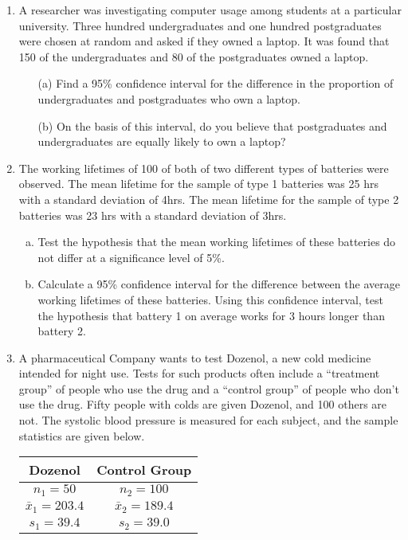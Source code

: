 \documentclass[]{article}
\begin{document}
\begin{enumerate}

\item 
 A researcher was investigating computer usage among students at a particular university. Three hundred undergraduates and one hundred postgraduates were chosen at random and asked if they owned a laptop. It was found that 150 of the undergraduates and 80 of the postgraduates owned a laptop. 
\begin{itemize}
    \item[(a)]  Find a 95\% confidence interval for the difference in the proportion of undergraduates and postgraduates who own a laptop. 
    \item[(b)] On the basis of this interval, do you believe that postgraduates and undergraduates are equally likely to own a laptop? 
\end{itemize}

    \item

The working lifetimes of 100 of both of two different types of batteries were observed. The mean lifetime for the sample of type 1 batteries was 25 hrs with a standard deviation of 4hrs. The mean lifetime for the sample of type 2 batteries was 23 hrs with a standard deviation of 3hrs. 
\begin{enumerate}[(a)]
\item Test the hypothesis that the mean working lifetimes of these batteries do not differ at a significance level of 5\%.
\item 
Calculate a 95\% confidence interval for the difference between the average working lifetimes of these batteries. Using this confidence interval, test the hypothesis that battery 1 on average works for 3 hours longer than battery 2.
\end{enumerate}
\item 
A pharmaceutical Company wants to test Dozenol, a new cold medicine intended
for night use. Tests for such products often include a “treatment group” of people
who use the drug and a “control group” of people who don’t use the drug. Fifty
people with colds are given Dozenol, and 100 others are not. The systolic blood
pressure is measured for each subject, and the sample statistics are given below.
\begin{center}
    \begin{tabular}{|c|c|} \hline
Dozenol & Control Group \\ \hline
$n_1 = 50$  & $n_2 = 100 $ \\ \hline
$\bar{x}_1 = 203.4$ & $\bar{x}_2 = 189.4$ \\ \hline
$s_1 = 39.4$  &  $s_2 = 39.0$ \\ \hline
\end{tabular}
\end{center}


\end{enumerate}
\end{document}
